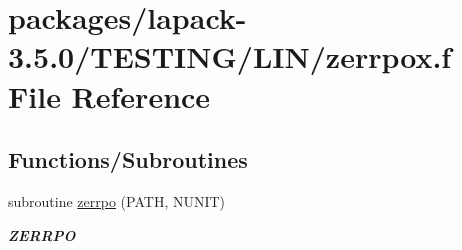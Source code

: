 \hypertarget{zerrpox_8f}{}\section{packages/lapack-\/3.5.0/\+T\+E\+S\+T\+I\+N\+G/\+L\+I\+N/zerrpox.f File Reference}
\label{zerrpox_8f}
\subsection*{Functions/\+Subroutines}
\begin{DoxyCompactItemize}
\item 
subroutine \hyperlink{group__complex16__lin_ga7de48323c06a0c6106e9b9c8398f09f0}{zerrpo} (P\+A\+T\+H, N\+U\+N\+I\+T)
\begin{DoxyCompactList}\small\item\em {\bfseries Z\+E\+R\+R\+P\+O} \end{DoxyCompactList}\end{DoxyCompactItemize}
